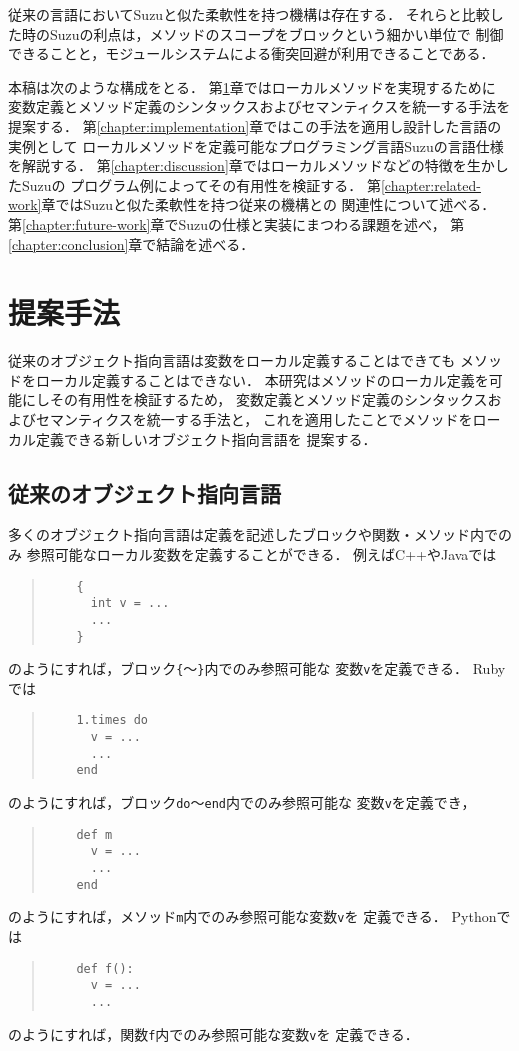 \documentclass[a4paper,11pt,dvipdfmx]{jreport}
\begin{document}
従来の言語においてSuzuと似た柔軟性を持つ機構は存在する．
それらと比較した時のSuzuの利点は，メソッドのスコープをブロックという細かい単位で
制御できることと，モジュールシステムによる衝突回避が利用できることである．

本稿は次のような構成をとる．
第\ref{chapter:proposal}章ではローカルメソッドを実現するために
変数定義とメソッド定義のシンタックスおよびセマンティクスを統一する手法を提案する．
第\ref{chapter:implementation}章ではこの手法を適用し設計した言語の実例として
ローカルメソッドを定義可能なプログラミング言語Suzuの言語仕様を解説する．
第\ref{chapter:discussion}章ではローカルメソッドなどの特徴を生かしたSuzuの
プログラム例によってその有用性を検証する．
第\ref{chapter:related-work}章ではSuzuと似た柔軟性を持つ従来の機構との
関連性について述べる．
第\ref{chapter:future-work}章でSuzuの仕様と実装にまつわる課題を述べ，
第\ref{chapter:conclusion}章で結論を述べる．


\chapter{提案手法}
\label{chapter:proposal}

従来のオブジェクト指向言語は変数をローカル定義することはできても
メソッドをローカル定義することはできない．
本研究はメソッドのローカル定義を可能にしその有用性を検証するため，
変数定義とメソッド定義のシンタックスおよびセマンティクスを統一する手法と，
これを適用したことでメソッドをローカル定義できる新しいオブジェクト指向言語を
提案する．

\section{従来のオブジェクト指向言語}

多くのオブジェクト指向言語は定義を記述したブロックや関数・メソッド内でのみ
参照可能なローカル変数を定義することができる．
例えばC++やJavaでは
\begin{quote}
	\begin{verbatim}
	{
	  int v = ...
	  ...
	}
	\end{verbatim}
\end{quote}
のようにすれば，ブロック\verb|{|～\verb|}|内でのみ参照可能な
変数\verb|v|を定義できる．
Rubyでは
\begin{quote}
	\begin{verbatim}
	1.times do
	  v = ...
	  ...
	end
	\end{verbatim}
\end{quote}
のようにすれば，ブロック\verb|do|～\verb|end|内でのみ参照可能な
変数\verb|v|を定義でき，
\begin{quote}
	\begin{verbatim}
	def m
	  v = ...
	  ...
	end
	\end{verbatim}
\end{quote}
のようにすれば，メソッド\verb|m|内でのみ参照可能な変数\verb|v|を
定義できる．
Pythonでは
\begin{quote}
	\begin{verbatim}
	def f():
	  v = ...
	  ...
	\end{verbatim}
\end{quote}
のようにすれば，関数\verb|f|内でのみ参照可能な変数\verb|v|を
定義できる．
\end{document}
